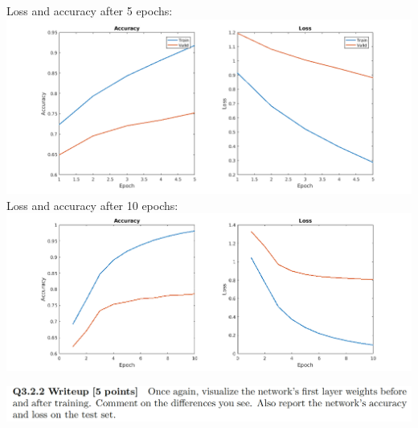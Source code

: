 \documentclass[12pt,letterpaper,boxed]{hmcpset}
\begin{document}
\begin{solution}
Loss and accuracy after 5 epochs:\\
\includegraphics[width=\textwidth]{3_2_1_1.png}\\
Loss and accuracy after 10 epochs:\\
\includegraphics[width=\textwidth]{3_2_1_2.png}\\
\end{solution}
\newpage

\begin{problem}[]
\includegraphics[width=\textwidth]{3_2_2.png}
\end{problem}
\end{document}
